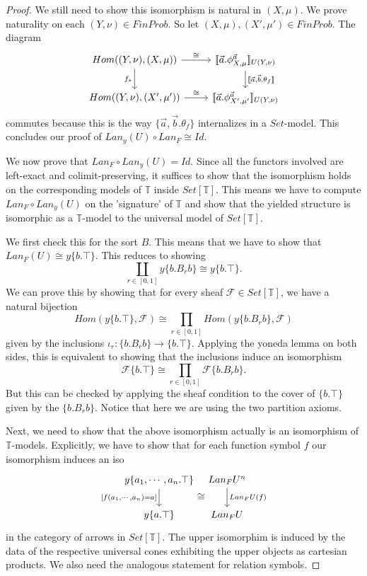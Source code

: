 \documentclass[a4paper]{amsproc}
\theoremstyle{plain}
\theoremstyle{definition}
\theoremstyle{remark}
\numberwithin{equation}{section}
\newcommand{\ldoub}{[\![ }
\newcommand{\rdoub}{]\!]}
\begin{document}
\begin{proof}
We still need to show this isomorphism is natural in $(X,\mu)$. We prove naturality on each $(Y,\nu) \in FinProb$. So let $(X,\mu), (X',\mu') \in FinProb$. The diagram
\[
\begin{tikzcd}
    {Hom((Y,\nu),(X,\mu))} \arrow[r, "\cong"] \arrow[d, "f_*"'] & {\ldoub \vec{a} . \phi^{\vec{a}}_{X,\mu} \rdoub_{U(Y,\nu)}} \arrow[d, "{\ldoub \vec{a},\vec{b} . \theta_f \rdoub}"] \\
    {Hom((Y,\nu),(X',\mu'))} \arrow[r, "\cong"]                 & {\ldoub \vec{a} . \phi^{\vec{a}}_{X',\mu'} \rdoub_{U(Y,\nu)}}                                             
\end{tikzcd}
\]
commutes because this is the way $\{\vec{a},\vec{b} . \theta_f \}$ internalizes in a $Set$-model. This concludes our proof of $Lan_y(U) \circ Lan_F \cong Id$.

We now prove that $Lan_F \circ Lan_y(U) = Id$. Since all the functors involved are left-exact and colimit-preserving, it suffices to show that the isomorphism holds on the corresponding models of $\mathbb{T}$ inside $Set[\mathbb{T}]$. This means we have to compute $Lan_F \circ Lan_y(U)$ on the 'signature' of $\mathbb{T}$ and show that the yielded structure is isomorphic as a $\mathbb{T}$-model to the universal model of $Set[\mathbb{T}]$.

We first check this for the sort $B$. This means that we have to show that $Lan_F(U) \cong y \{b . \top\}$. This reduces to showing
\[
\coprod_{r \in [0,1]} y \{b . B_r b\} \cong y \{b . \top\} .
\]
We can prove this by showing that for every sheaf $\mathcal{F} \in Set[\mathbb{T}]$, we have a natural bijection
\[
Hom(y \{b . \top\}, \mathcal{F}) \cong \prod_{r \in [0,1]} Hom(y \{b . B_r b\}, \mathcal{F})
\]
given by the inclusions $\iota_r : \{b . B_r b\} \to \{b . \top\}$. Applying the yoneda lemma on both sides, this is equivalent to showing that the inclusions induce an isomorphism
\[
\mathcal{F} \{b . \top\} \cong \prod_{r \in [0,1]} \mathcal{F} \{b . B_r b\} .
\]
But this can be checked by applying the sheaf condition to the cover of $\{b . \top\}$ given by the $\{b . B_r b\}$. Notice that here we are using the two partition axioms.

Next, we need to show that the above isomorphism actually is an isomorphism of $\mathbb{T}$-models. Explicitly, we have to show that for each function symbol $f$ our isomorphism induces an iso
\[
\begin{tikzcd}[column sep=tiny]
    {y \{a_1,\cdots,a_n . \top \}} \arrow[d, "{[f(a_1,\cdots,a_n) = a]}"'] \arrow[r, "\cong"',phantom, shift right=7] & Lan_F U^n \arrow[d, "Lan_F U(f)"] \\
    y \{a . \top \}                                                                                           & Lan_F U                            
\end{tikzcd}
\]
in the category of arrows in $Set[\mathbb{T}]$. The upper isomorphim is induced by the data of the respective universal cones exhibiting the upper objects as cartesian products. We also need the analogous statement for relation symbols.


\end{proof}
\end{document}
